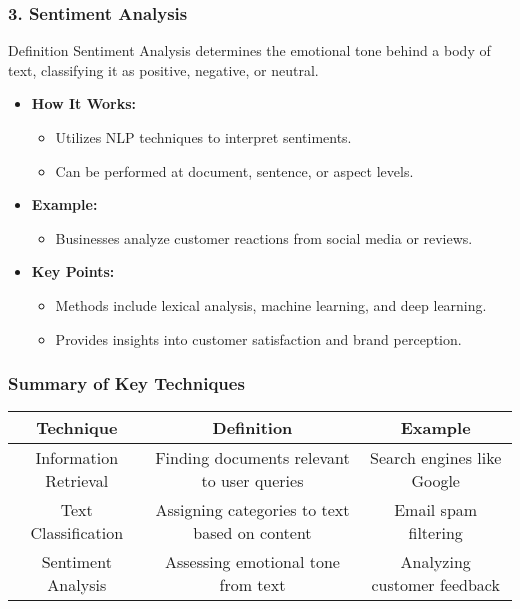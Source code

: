 \documentclass[aspectratio=169]{beamer}
\begin{document}
\begin{frame}[fragile]
    \frametitle{3. Sentiment Analysis}
    \begin{block}{Definition}
        Sentiment Analysis determines the emotional tone behind a body of text, classifying it as positive, negative, or neutral.
    \end{block}
    \begin{itemize}
        \item \textbf{How It Works:}
        \begin{itemize}
            \item Utilizes NLP techniques to interpret sentiments.
            \item Can be performed at document, sentence, or aspect levels.
        \end{itemize}
        \item \textbf{Example:} 
        \begin{itemize}
            \item Businesses analyze customer reactions from social media or reviews.
        \end{itemize}
        \item \textbf{Key Points:}
        \begin{itemize}
            \item Methods include lexical analysis, machine learning, and deep learning.
            \item Provides insights into customer satisfaction and brand perception.
        \end{itemize}
    \end{itemize}
\end{frame}

\begin{frame}[fragile]
    \frametitle{Summary of Key Techniques}
    \begin{tabular}{|c|c|c|}
        \hline
        \textbf{Technique} & \textbf{Definition} & \textbf{Example} \\
        \hline
        Information Retrieval & Finding documents relevant to user queries & Search engines like Google \\
        \hline
        Text Classification & Assigning categories to text based on content & Email spam filtering \\
        \hline
        Sentiment Analysis & Assessing emotional tone from text & Analyzing customer feedback \\
        \hline
    \end{tabular}
\end{frame}
\end{document}
